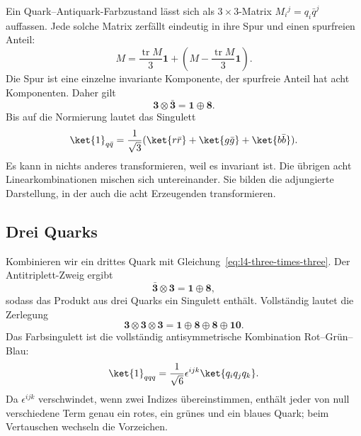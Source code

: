 Ein Quark--Antiquark-Farbzustand lässt sich als \(3\times3\)-Matrix \(M_i{}^j=q_i\bar q^j\) auffassen. Jede solche Matrix zerfällt eindeutig in ihre Spur und einen spurfreien Anteil:
\begin{equation}
M=\frac{\operatorname{tr}M}{3}\boldsymbol 1
+\left(M-\frac{\operatorname{tr}M}{3}\boldsymbol 1\right).
\end{equation}
Die Spur ist eine einzelne invariante Komponente, der spurfreie Anteil hat acht Komponenten. Daher gilt
\begin{equation}
\boldsymbol 3\otimes\bar{\boldsymbol 3}
=\boldsymbol 1\oplus\boldsymbol 8.
\label{eq:l4-three-times-threebar}
\end{equation}
Bis auf die Normierung lautet das Singulett
\begin{equation}
\ket{1}_{q\bar q}
=\frac{1}{\sqrt3}
(\ket{r\bar r}+\ket{g\bar g}+\ket{b\bar b}).
\end{equation}
Es kann in nichts anderes transformieren, weil es invariant ist. Die übrigen acht Linearkombinationen mischen sich untereinander. Sie bilden die adjungierte Darstellung, in der auch die acht Erzeugenden transformieren.

\subsection{Drei Quarks}

Kombinieren wir ein drittes Quark mit Gleichung~\eqref{eq:l4-three-times-three}. Der Antitriplett-Zweig ergibt
\begin{equation}
\bar{\boldsymbol 3}\otimes\boldsymbol 3
=\boldsymbol 1\oplus\boldsymbol 8,
\end{equation}
sodass das Produkt aus drei Quarks ein Singulett enthält. Vollständig lautet die Zerlegung
\begin{equation}
\boldsymbol 3\otimes\boldsymbol 3\otimes\boldsymbol 3
=\boldsymbol 1\oplus\boldsymbol 8\oplus\boldsymbol 8
\oplus\boldsymbol{10}.
\label{eq:l4-three-quark-full}
\end{equation}
Das Farbsingulett ist die vollständig antisymmetrische Kombination Rot--Grün--Blau:
\begin{equation}
\ket{1}_{qqq}
=\frac{1}{\sqrt6}\epsilon^{ijk}\ket{q_iq_jq_k}.
\label{eq:l4-baryon-singlet}
\end{equation}
Da \(\epsilon^{ijk}\) verschwindet, wenn zwei Indizes übereinstimmen, enthält jeder von null verschiedene Term genau ein rotes, ein grünes und ein blaues Quark; beim Vertauschen wechseln die Vorzeichen.

